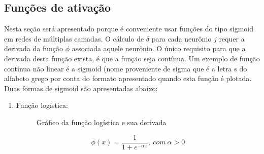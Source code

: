 \subsection{Funções de ativação}

Nesta seção será apresentado porque é conveniente usar funções do tipo sigmoid em redes de múltiplas camadas.
O cálculo de $\delta$ para cada neurônio $j$ requer a derivada da função $\phi$ associada aquele neurônio. O único requisito para que a derivada desta função exista, é que a função seja contínua.
Um exemplo de função contínua não linear é a sigmoid (nome proveniente de sigma que é a letra s do alfabeto grego por conta do formato apresentado quando esta função é plotada.
Duas formas de sigmoid são apresentadas abaixo:

\begin{enumerate}
    \item Função logística:
    \begin{figure}[H]
    \centering
    \caption{Gráfico da função logística e sua derivada}
    \end{figure}
    \begin{equation}
        \phi(x) = \frac{1}{1+e^{-\alpha x}}, \: com \: \alpha > 0
    \end{equation}

\end{enumerate}
